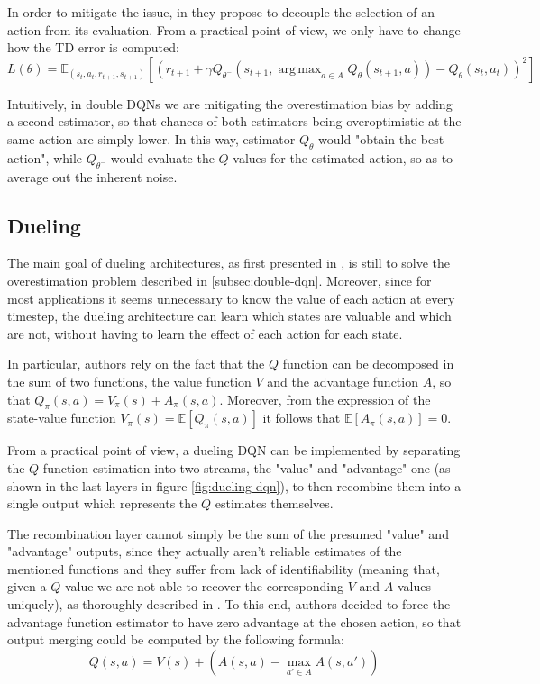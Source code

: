 \documentclass[a4paper,10pt]{report}
\DeclareMathOperator*{\argmax}{arg\,max}
\begin{document}
In order to mitigate the issue, in \cite{double-dqn} they propose to decouple the selection of an action from its evaluation. From a practical point of view, we only have to change how the TD error is computed:
$$
L(\theta)=\mathbb{E}_{(s_t,a_t,r_{t+1},s_{t+1})}\left[\left(r_{t+1}+\gamma Q_{\theta^-}(s_{t+1},\argmax_{a \in A}Q_\theta(s_{t+1},a)) - Q_{\theta}(s_t, a_t)\right)^2\right]
$$

Intuitively, in double DQNs we are mitigating the overestimation bias by adding a second estimator, so that chances of both estimators being overoptimistic at the same action are simply lower. In this way, estimator $Q_{\theta}$ would "obtain the best action", while $Q_{\theta^-}$ would evaluate the $Q$ values for the estimated action, so as to average out the inherent noise.

\subsection{Dueling}\label{subsec:dueling-dqn}
The main goal of dueling architectures, as first presented in \cite{dueling-dqn}, is still to solve the overestimation problem described in \ref{subsec:double-dqn}. Moreover, since for most applications it seems unnecessary to know the value of each action at every timestep, the dueling architecture can learn which states are valuable and which are not, without having to learn the effect of each action for each state.

In particular, authors rely on the fact that the $Q$ function can be decomposed in the sum of two functions, the value function $V$ and the advantage function $A$, so that $Q_\pi(s,a)=V_\pi(s)+A_\pi(s,a)$. Moreover, from the expression of the state-value function $V_\pi(s)=\mathbb{E}\left[Q_\pi\left(s,a\right)\right]$ it follows that $\mathbb{E}\left[A_\pi\left(s,a\right)\right]=0$.

From a practical point of view, a dueling DQN can be implemented by separating the $Q$ function estimation into two streams, the "value" and "advantage" one (as shown in the last layers in figure \ref{fig:dueling-dqn}), to then recombine them into a single output which represents the $Q$ estimates themselves.

The recombination layer cannot simply be the sum of the presumed "value" and "advantage" outputs, since they actually aren't reliable estimates of the mentioned functions and they suffer from lack of identifiability (meaning that, given a $Q$ value we are not able to recover the corresponding $V$ and $A$ values uniquely), as thoroughly described in \cite{dueling-dqn}. To this end, authors decided to force the advantage function estimator to have zero advantage at the
chosen action, so that output merging could be computed by the following formula:
$$
Q(s,a)=V(s) + \left(A(s,a) - \max_{a'\in A}A(s,a')\right)
$$
\end{document}
